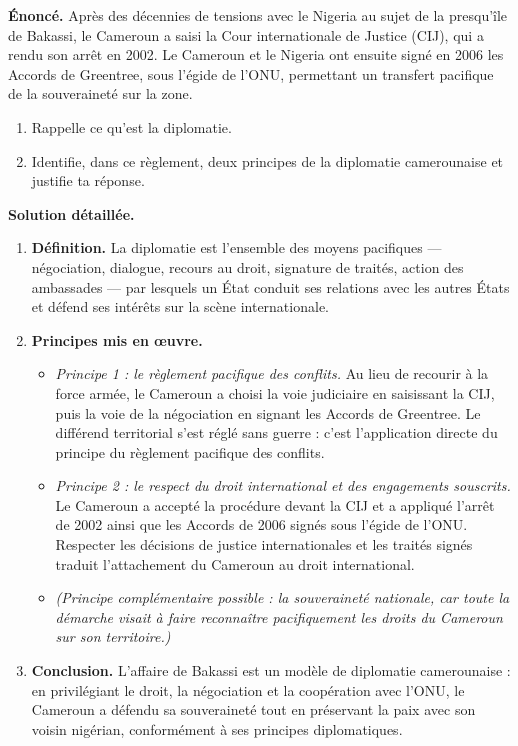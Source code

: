 \documentclass[11pt]{article}
\begin{document}
\begin{exoresolu}
\textbf{Énoncé.} Après des décennies de tensions avec le Nigeria au sujet de la presqu'île de Bakassi, le Cameroun a saisi la Cour internationale de Justice (CIJ), qui a rendu son arrêt en 2002. Le Cameroun et le Nigeria ont ensuite signé en 2006 les Accords de Greentree, sous l'égide de l'ONU, permettant un transfert pacifique de la souveraineté sur la zone.
\begin{enumerate}
\item Rappelle ce qu'est la diplomatie.
\item Identifie, dans ce règlement, deux principes de la diplomatie camerounaise et justifie ta réponse.
\end{enumerate}
\tcblower
\textbf{Solution détaillée.}
\begin{enumerate}
\item \textbf{Définition.} La diplomatie est l'ensemble des moyens pacifiques — négociation, dialogue, recours au droit, signature de traités, action des ambassades — par lesquels un État conduit ses relations avec les autres États et défend ses intérêts sur la scène internationale.
\item \textbf{Principes mis en œuvre.}
\begin{itemize}
\item \emph{Principe 1 : le règlement pacifique des conflits.} Au lieu de recourir à la force armée, le Cameroun a choisi la voie judiciaire en saisissant la CIJ, puis la voie de la négociation en signant les Accords de Greentree. Le différend territorial s'est réglé sans guerre : c'est l'application directe du principe du règlement pacifique des conflits.
\item \emph{Principe 2 : le respect du droit international et des engagements souscrits.} Le Cameroun a accepté la procédure devant la CIJ et a appliqué l'arrêt de 2002 ainsi que les Accords de 2006 signés sous l'égide de l'ONU. Respecter les décisions de justice internationales et les traités signés traduit l'attachement du Cameroun au droit international.
\item \emph{(Principe complémentaire possible : la souveraineté nationale, car toute la démarche visait à faire reconnaître pacifiquement les droits du Cameroun sur son territoire.)}
\end{itemize}
\item \textbf{Conclusion.} L'affaire de Bakassi est un modèle de diplomatie camerounaise : en privilégiant le droit, la négociation et la coopération avec l'ONU, le Cameroun a défendu sa souveraineté tout en préservant la paix avec son voisin nigérian, conformément à ses principes diplomatiques.
\end{enumerate}
\end{exoresolu}
\end{document}
